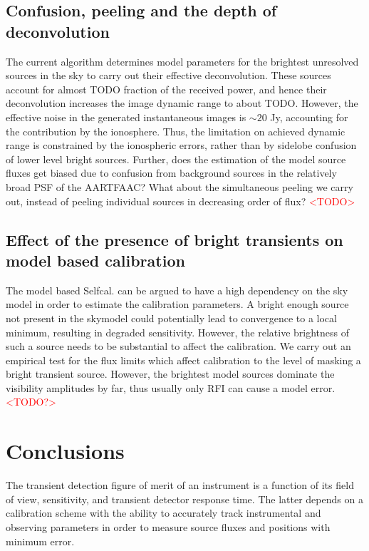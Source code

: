 \documentclass{aa}
\begin{document}
\subsection{\label{sub:Confusion,-peeling-and}Confusion, peeling and the depth
of deconvolution }

The current algorithm determines model parameters for the brightest
unresolved sources in the sky to carry out their effective deconvolution.
These sources account for almost TODO fraction of the received power,
and hence their deconvolution increases the image dynamic range to
about TODO. However, the effective noise in the generated instantaneous
images is $\sim20$ Jy, accounting for the contribution by the ionosphere.
Thus, the limitation on achieved dynamic range is constrained by the
ionospheric errors, rather than by sidelobe confusion of lower level
bright sources. Further, does the estimation of the model source fluxes
get biased due to confusion from background sources in the relatively
broad PSF of the AARTFAAC? What about the simultaneous peeling we
carry out, instead of peeling individual sources in decreasing order
of flux?\textcolor{red}{{} <TODO> }


\subsection{Effect of the presence of bright transients on model based calibration}

The model based Selfcal. can be argued to have a high dependency on
the sky model in order to estimate the calibration parameters. A bright
enough source not present in the skymodel could potentially lead to
convergence to a local minimum, resulting in degraded sensitivity.
However, the relative brightness of such a source needs to be substantial
to affect the calibration. We carry out an empirical test for the
flux limits which affect calibration to the level of masking a bright
transient source. However, the brightest model sources dominate the
visibility amplitudes by far, thus usually only RFI can cause a model
error. \textcolor{red}{<TODO?>}


\section{Conclusions}

The transient detection figure of merit of an instrument is a function
of its field of view, sensitivity, and transient detector response
time. The latter depends on a calibration scheme with the ability
to accurately track instrumental and observing parameters in order
to measure source fluxes and positions with minimum error. 
\end{document}
